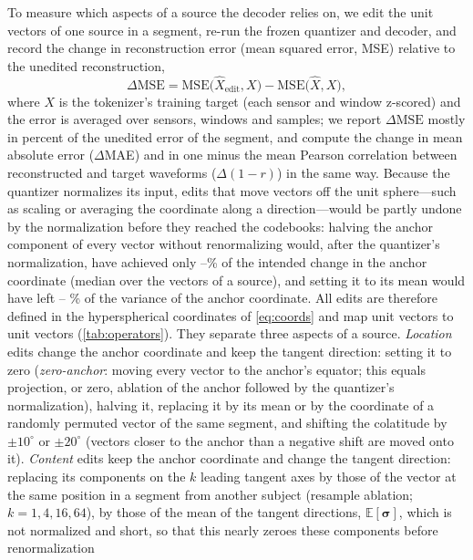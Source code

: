 \documentclass[10pt,letterpaper]{article}
\newcommand{\dmse}{\ensuremath{\Delta\mathrm{MSE}}}
\newcommand{\E}{\mathbb{E}}
\begin{document}
To measure which aspects of a source the decoder relies on, we edit the unit vectors of one
source in a segment, re-run the frozen quantizer and decoder, and record the change in
reconstruction error (mean squared error, MSE) relative to the unedited reconstruction,
\begin{equation}
  \dmse=\mathrm{MSE}\bigl(\hat{X}_{\text{edit}},X\bigr)-\mathrm{MSE}\bigl(\hat{X},X\bigr),
\end{equation}
where $X$ is the tokenizer's training target (each sensor and window z-scored) and the error is
averaged over sensors, windows and samples; we report $\dmse$ mostly in percent of the unedited
error of the segment, and compute the change in mean absolute error ($\Delta$MAE) and in one
minus the mean Pearson correlation between reconstructed and target waveforms ($\Delta(1-r)$)
in the same way. Because the quantizer normalizes its input, edits that move vectors off the
unit sphere---such as scaling or averaging the coordinate along a direction---would be partly
undone by the normalization before they reached the codebooks: halving the anchor component of
every vector without renormalizing would, after the quantizer's normalization, have achieved only
\OffSphereHalfMin--\OffSphereHalfMax\% of the intended change in the anchor coordinate (median over
the vectors of a source), and setting it to its mean would have left \OffSphereMeanLeftMin--%
\OffSphereMeanLeftMax\% of the variance of the anchor coordinate. All edits are therefore defined
in the hyperspherical coordinates of \cref{eq:coords} and map unit vectors to unit vectors
(\cref{tab:operators}). They separate three aspects of a source. \emph{Location} edits
change the anchor coordinate and keep the tangent direction: setting it to zero (\emph{zero-anchor}: moving every
vector to the anchor's equator; this equals projection, or zero, ablation of the anchor
followed by the quantizer's normalization), halving it, replacing it by its mean or by the
coordinate of a randomly permuted vector of the same segment, and shifting the colatitude by
$\pm10^\circ$ or $\pm20^\circ$ (vectors closer to the anchor than a negative shift are moved onto
it). \emph{Content} edits keep the anchor coordinate and change the
tangent direction: replacing its components on the $k$ leading tangent axes by those of the
vector at the same position in a segment from another subject (resample ablation;
$k=1,4,16,64$), by those of the mean of the tangent directions, $\E[\bm{\sigma}]$, which is
not normalized and short, so that this nearly zeroes these components before renormalization
\end{document}

